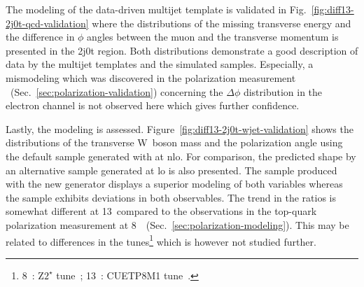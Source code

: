 The modeling of the data-driven multijet template is validated in Fig.~\ref{fig:diff13-2j0t-qcd-validation} where the distributions of the missing transverse energy and the difference in $\phi$ angles between the muon and the transverse momentum is presented in the 2j0t region. Both distributions demonstrate a good description of data by the multijet templates and the simulated samples. Especially, a mismodeling which was discovered in the polarization measurement ~(Sec.~\ref{sec:polarization-validation}) concerning the $\Delta\phi$ distribution in the electron channel is not observed here which gives further confidence.


Lastly, the \wjets modeling is assessed. Figure~\ref{fig:diff13-2j0t-wjet-validation} shows the distributions of the transverse W~boson mass and the polarization angle using the default \wjets sample generated with \MGAMC at \gls{nlo}. For comparison, the predicted shape by an alternative \wjets sample generated \MG at \gls{lo} is also presented. The sample produced with the new \MGAMC generator displays a superior modeling of both variables whereas the \MG \wjets sample exhibits deviations in both observables. The trend in the ratios is somewhat different at 13~\TeV compared to the observations in the top-quark polarization measurement at 8~\TeV~(Sec.~\ref{sec:polarization-modeling}). This may be related to differences in the \PYTHIA tunes\footnote{8~\TeV:  $\mathrm{Z2}^\star$ tune~\cite{Chatrchyan:2011id}; 13~\TeV:  CUETP8M1 tune~\cite{Khachatryan:2015pea}.} which is however not studied further.




